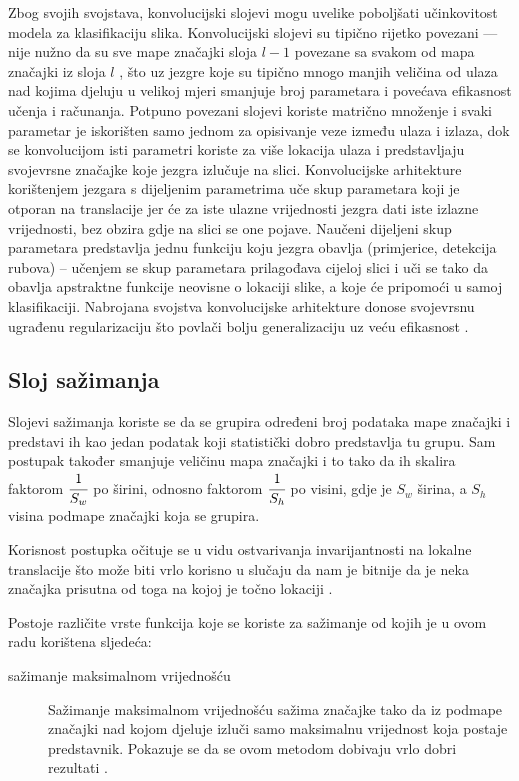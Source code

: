 \documentclass[times, utf8, diplomski, numeric]{fer}
\begin{document}
Zbog svojih svojstava, konvolucijski slojevi mogu uvelike poboljšati učinkovitost modela za klasifikaciju slika.
Konvolucijski slojevi su tipično rijetko povezani --- nije nužno da su sve mape značajki sloja $l-1$ povezane sa svakom od mapa značajki iz sloja $l$ \citep{book:deeplearningbook}, što uz jezgre koje su tipično mnogo manjih veličina od ulaza nad kojima djeluju u velikoj mjeri smanjuje broj parametara i povećava efikasnost učenja i računanja.
Potpuno povezani slojevi koriste matrično množenje i svaki parametar je iskorišten samo jednom za opisivanje veze između ulaza i izlaza, dok se konvolucijom isti parametri koriste za više lokacija ulaza i predstavljaju svojevrsne značajke koje jezgra izlučuje na slici.
Konvolucijske arhitekture korištenjem jezgara s dijeljenim parametrima uče skup parametara koji je otporan na translacije jer će za iste ulazne vrijednosti jezgra dati iste izlazne vrijednosti, bez obzira gdje na slici se one pojave. 
Naučeni dijeljeni skup parametara predstavlja jednu funkciju koju jezgra obavlja (primjerice, detekcija rubova) -- učenjem se skup parametara prilagođava cijeloj slici i uči se tako da obavlja apstraktne funkcije neovisne o lokaciji slike, a koje će pripomoći u samoj klasifikaciji.
Nabrojana svojstva konvolucijske arhitekture donose svojevrsnu ugrađenu regularizaciju što povlači bolju generalizaciju uz veću efikasnost \citep{book:deeplearningbook} \citep{masters:vukotic_ms} \citep{seminar:rela}.

\subsection{Sloj sažimanja}
Slojevi sažimanja koriste se da se grupira određeni broj podataka mape značajki i predstavi ih kao jedan podatak koji statistički dobro predstavlja tu grupu.
Sam postupak također smanjuje veličinu mapa značajki i to tako da ih skalira faktorom $\cfrac{1}{S_w}$ po širini, odnosno faktorom $\cfrac{1}{S_h}$ po visini, gdje je $S_w$ širina, a $S_h$ visina podmape značajki koja se grupira.

Korisnost postupka očituje se u vidu ostvarivanja invarijantnosti na lokalne translacije što može biti vrlo korisno u slučaju da nam je bitnije da je neka značajka prisutna od toga na kojoj je točno lokaciji \citep{seminar:rela}.

Postoje različite vrste funkcija koje se koriste za sažimanje od kojih je u ovom radu korištena sljedeća:
\begin{description}
\item [sažimanje maksimalnom vrijednošću]
Sažimanje maksimalnom vrijednošću  sažima značajke tako da iz podmape značajki nad kojom djeluje izluči samo maksimalnu vrijednost koja postaje predstavnik.
Pokazuje se da se ovom metodom dobivaju vrlo dobri rezultati \citep{article:maxpooling_article}.
\end{description}
\end{document}
